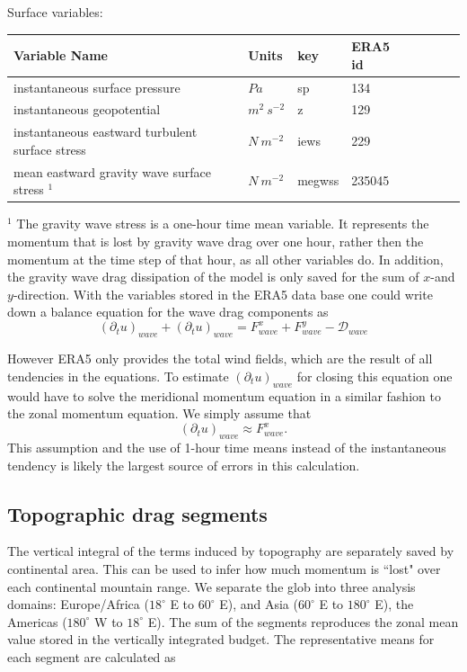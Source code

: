 \documentclass[11pt]{article}
\numberwithin{equation}{section}
\begin{document}
Surface variables:
\begin{table}[h!]
\label{table:srf_var}
\begin{center}
    \begin{tabular}{ | l | l | l | l | l | l | l | l |}
    \hline
    Variable Name & Units & key & ERA5 id  \\ \hline
    instantaneous surface pressure & $Pa$   & sp    &  134 \\ \hline
    instantaneous geopotential & $m^2~s^{-2}$   & z    &  129 \\ \hline
    instantaneous eastward turbulent surface stress & $N~m^{-2}$   & iews  &  229 \\ \hline
    mean eastward gravity wave surface stress $^1$ & $N~m^{-2}$  & megwss  &  235045 \\ \hline
        \end{tabular}
\end{center}
\end{table}

\begingroup
    \fontsize{9pt}{11pt}\selectfont
$^1$ The gravity wave stress is a one-hour time mean variable. It represents the momentum that is lost by gravity wave drag over one hour, rather then the momentum at the time step of that hour, as all other variables do. In addition, the gravity wave drag dissipation of the model is only saved for the sum of $x$-and $y$-direction. With the variables stored in the ERA5 data base one could write down a balance equation for the wave drag components as 
$$ \left(\partial_t u\right)_{wave} + \left(\partial_t u\right)_{wave} =  F^x_{wave} + F^y_{wave} - \mathcal{D}_{wave} $$

However ERA5 only provides the total wind fields, which are the result of all tendencies in the equations. To estimate $\left(\partial_t u\right)_{wave}$ for closing this equation one would have to solve the meridional momentum equation in a similar fashion to the zonal momentum equation. We simply assume that
$$ \left(\partial_t u\right)_{wave}  \approx  F^x_{wave}.$$
This assumption and the use of 1-hour time means instead of the instantaneous tendency is likely the largest source of errors in this calculation.
\endgroup

\subsection{Topographic drag segments}
The vertical integral of the terms induced by topography are separately saved by continental area. This can be used to infer how much momentum is ``lost" over each continental mountain range. We separate the glob into three analysis domains:  Europe/Africa ($18^\circ$ E to $60^\circ$ E), and Asia ($60^\circ$ E to $180^\circ$ E), the Americas ($180^\circ$ W to $18^\circ$ E). The sum of the segments reproduces the zonal mean value stored in the vertically integrated budget.
The representative means for each segment are calculated as 
\end{document}
